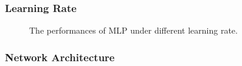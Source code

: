 \documentclass[12pt,a4paper]{article}
\theoremstyle{definition}
\begin{document}
\subsubsection{Learning Rate}

\begin{figure}[H]
	\centering
	\caption{The performances of MLP under different learning rate.}
	\label{fig:mlp-lr}
\end{figure}

\subsubsection{Network Architecture}
\end{document}
